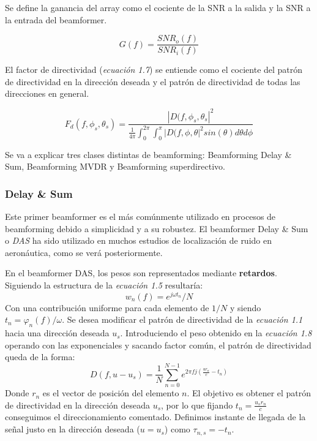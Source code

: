 \documentclass[a4paper,11pt]{book}
\begin{document}
		Se define la ganancia del array como el cociente de la SNR a la salida y la SNR a la entrada del beamformer.
		
		\begin{equation}
		G(f) = \frac{SNR_{o}(f)}{SNR_{i}(f)}
		\end{equation}
		
El factor de directividad (\textit{ecuación 1.7}) se entiende como el cociente del patrón de directividad en la dirección deseada y el patrón de directividad de todas las direcciones en general.

\begin{equation}
F_{d}(f, \phi_{s}, \theta_{s}) = \frac{|D(f, \phi_{s}, \theta_{s}|^{2}}{\frac{1}{4 \pi} \int_{0}^{2\pi}\int_{0}^{\pi}|D(f, \phi, \theta|^{2} sin(\theta) d\theta d\phi}
\end{equation}
		
				Se va a explicar tres clases distintas de beamforming: Beamforming Delay \& Sum, Beamforming MVDR y Beamforming superdirectivo.
		\subsubsection{Delay \& Sum}
		Este primer beamformer es el más comúnmente utilizado en procesos de beamforming debido a simplicidad y a su robustez. El beamformer Delay \& Sum o \textit{DAS} ha sido utilizado en muchos estudios de localización de ruido en aeronáutica, como se verá posteriormente.
		
		En el beamformer DAS, los pesos son representados mediante \textbf{retardos}. Siguiendo la estructura de la \textit{ecuación 1.5} resultaría:
		\begin{equation}
		w_{n}(f) = e^{j \omega t_{n}} / N
		\end{equation}
		Con una contribución uniforme para cada elemento de $1/N$ y siendo $t_{n} = \varphi_{n}(f) / \omega$. Se desea modificar el patrón de directividad de la \textit{ecuación 1.1} hacia una dirección deseada $u_{s}$. Introduciendo el peso obtenido en la \textit{ecuación 1.8} operando con las exponenciales y sacando factor común, el patrón de directividad queda de la forma:
\begin{equation}
		D(f, u-u_{s}) = \frac{1}{N} \sum_{n = 0}^{N-1} e^{2\pi f j (\frac{u r_{n}}{c} - t_{n})}
		\end{equation}		
		Donde $r_{n}$ es el vector de posición del elemento $n$. El objetivo es obtener el patrón de directividad en la dirección deseada $u_{s}$, por lo que fijando $t_{n} = \frac{u_{s} r_{n}}{c}$ conseguimos el direccionamiento comentado. Definimos instante de llegada de la señal justo en la dirección deseada ($u = u_{s}$) como $\tau_{n,s} = -t_{n}$. 		
		
\end{document}
